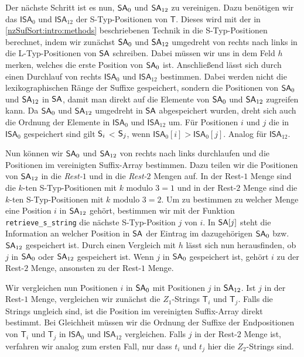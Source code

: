 Der nächste Schritt ist es nun, $\sa_0$ und $\sa_{12}$ zu vereinigen. Dazu benötigen wir das $\mathsf{ISA}_0$ und $\mathsf{ISA}_{12}$ der S-Typ-Positionen von $\mathsf{T}$. Dieses wird mit der in \cref{nzSufSort:intro:methods} beschriebenen Technik in die S-Typ-Positionen berechnet, indem wir zunächst $\sa_0$ und $\sa_{12}$ umgedreht von rechts nach links in die L-Typ-Positionen von $\sa$ schreiben. Dabei müssen wir uns in dem Feld $h$ merken, welches die erste Position von $\sa_0$ ist. Anschließend lässt sich durch einen Durchlauf von rechts $\mathsf{ISA}_0$ und $\mathsf{ISA}_{12}$ bestimmen. Dabei werden nicht die lexikographischen Ränge der Suffixe gespeichert, sondern die Positionen von $\sa_0$ und $\sa_{12}$ in $\sa$, damit man direkt auf die Elemente von $\sa_0$ und $\sa_{12}$ zugreifen kann. Da $\sa_0$ und $\sa_{12}$ umgedreht in $\sa$ abgespeichert wurden, dreht sich auch die Ordnung der Elemente in $\mathsf{ISA}_0$ und $\mathsf{ISA}_{12}$ um. Für Positionen $i$ und $j$ die in $\mathsf{ISA}_0$ gespeichert sind gilt $\mathsf{S}_{i}$ < $\mathsf{S}_{j}$, wenn $\mathsf{ISA}_0[i] > \mathsf{ISA}_0[j]$. Analog für $\mathsf{ISA}_{12}$. \par
Nun können wir $\sa_0$ und $\sa_{12}$ von rechts nach links durchlaufen und die Positionen im vereinigten Suffix-Array bestimmen. Dazu teilen wir die Positionen von $\sa_{12}$ in die \textit{Rest-$1$} und in die \textit{Rest-$2$} Mengen auf. In der Rest-$1$ Menge sind die $k$-ten S-Typ-Positionen mit $k \text{ modulo } 3 = 1$ und in der Rest-$2$ Menge sind die $k$-ten S-Typ-Positionen mit $k \text{ modulo } 3 = 2$. Um zu bestimmen zu welcher Menge eine Position $i$ in $\sa_{12}$ gehört, bestimmen wir mit der Funktion \texttt{retrieve\_s\_string} die nächste S-Typ-Position $j$ von $i$. In $\sa[j]$ steht die Information an welcher Position in $\sa$ der Eintrag im dazugehörigen $\sa_0$ bzw. $\sa_{12}$ gespeichert ist. Durch einen Vergleich mit $h$ lässt sich nun herausfinden, ob $j$ in $\sa_0$ oder $\sa_{12}$ gespeichert ist. Wenn $j$ in $\sa_0$ gespeichert ist, gehört $i$ zu der Rest-$2$ Menge, ansonsten zu der Rest-$1$ Menge. \par
Wir vergleichen nun Positionen $i$ in $\sa_0$ mit Positionen $j$ in $\sa_{12}$. Ist $j$ in der Rest-$1$ Menge, vergleichen wir zunächst die $Z_1$-Strings $\mathsf{T}_i$ und $\mathsf{T}_j$. Falls die Strings ungleich sind, ist die Position im vereinigten Suffix-Array direkt bestimmt. Bei Gleichheit müssen wir die Ordnung der Suffixe der Endpositionen von $\mathsf{T}_i$ und $\mathsf{T}_j$ in $\mathsf{ISA}_0$ und $\mathsf{ISA}_{12}$ vergleichen. Falls $j$ in der Rest-$2$ Menge ist, verfahren wir analog zum ersten Fall, nur dass $t_i$ und $t_j$ hier die $Z_2$-Strings sind. \par
